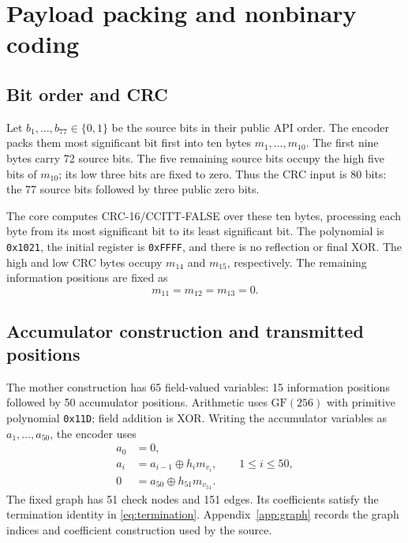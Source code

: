 \documentclass[11pt,a4paper]{article}
\newcommand{\GF}{\mathrm{GF}}
\begin{document}
\section{Payload packing and nonbinary coding}
\label{sec:coding}

\subsection{Bit order and CRC}

Let $b_1,\ldots,b_{77}\in\{0,1\}$ be the source bits in their public API
order. The encoder packs them most significant bit first into ten bytes
$m_1,\ldots,m_{10}$. The first nine bytes carry 72 source bits. The five
remaining source bits occupy the high five bits of $m_{10}$; its low three
bits are fixed to zero. Thus the CRC input is 80 bits: the 77 source bits
followed by three public zero bits.

The core computes CRC-16/CCITT-FALSE over these ten bytes, processing each
byte from its most significant bit to its least significant bit. The
polynomial is \texttt{0x1021}, the initial register is \texttt{0xFFFF}, and
there is no reflection or final XOR. The high and low CRC bytes occupy
$m_{14}$ and $m_{15}$, respectively. The remaining information positions are
fixed as
\begin{equation}
  m_{11}=m_{12}=m_{13}=0.
  \label{eq:shortening}
\end{equation}
\subsection{Accumulator construction and transmitted positions}

The mother construction has 65 field-valued variables: 15 information
positions followed by 50 accumulator positions. Arithmetic uses
$\GF(256)$ with primitive polynomial \texttt{0x11D}; field addition is XOR.
Writing the accumulator variables as $a_1,\ldots,a_{50}$, the encoder uses
\begin{align}
  a_0 &= 0, \nonumber\\
  a_i &= a_{i-1}\oplus h_i m_{v_i},\qquad 1\le i\le50, \label{eq:accumulator}\\
  0 &= a_{50}\oplus h_{51}m_{v_{51}}. \label{eq:termination}
\end{align}
The fixed graph has 51 check nodes and 151 edges. Its coefficients satisfy
the termination identity in \eqref{eq:termination}. Appendix~\ref{app:graph}
records the graph indices and coefficient construction used by the source.
\end{document}
